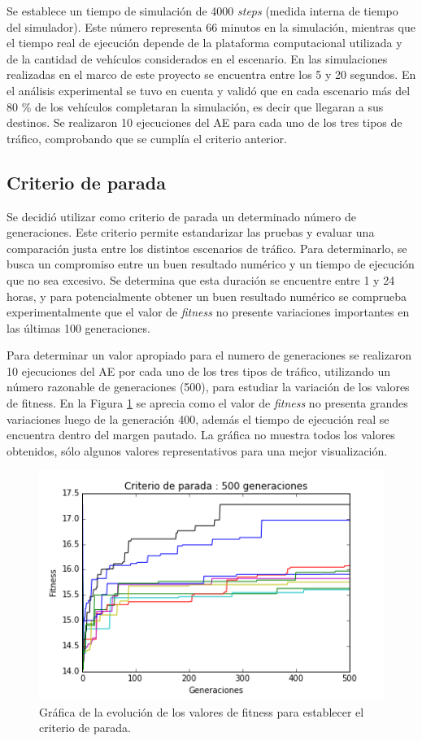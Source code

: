 Se establece un tiempo de simulación de 4000 \emph{steps} (medida interna de tiempo del simulador). Este número representa 66 minutos en la simulación, mientras que el tiempo real de ejecución depende de la plataforma computacional utilizada y de la cantidad de vehículos considerados en el escenario. En las simulaciones realizadas en el marco de este proyecto se encuentra entre los 5 y 20 segundos. En el análisis experimental se tuvo en cuenta y validó que en cada escenario más del 80 \% de los vehículos completaran la simulación, es decir que llegaran a sus destinos. Se realizaron 10 ejecuciones del AE para cada uno de los tres tipos de tráfico, comprobando que se cumplía el criterio anterior.


\subsection{Criterio de parada}
Se decidió utilizar como criterio de parada un determinado número de generaciones. Este criterio permite estandarizar las pruebas y evaluar una comparación justa entre los distintos escenarios de tráfico. Para determinarlo, se busca un compromiso entre un buen resultado numérico y un tiempo de ejecución que no sea excesivo. Se determina que esta duración se encuentre entre 1 y 24 horas, y para potencialmente obtener un buen resultado numérico se comprueba experimentalmente que el valor de \emph{fitness} no presente variaciones importantes en las últimas 100 generaciones.  

Para determinar un valor apropiado para el numero de generaciones se realizaron 10 ejecuciones del AE por cada uno de los tres tipos de tráfico, utilizando un número razonable de generaciones (500), para estudiar la variación de los valores de fitness. En la Figura \ref{fig:criterio_parada} se aprecia como el valor de \emph{fitness} no presenta grandes variaciones luego de la generación 400, además el tiempo de ejecución real se encuentra dentro del margen pautado. La gráfica no muestra todos los valores obtenidos, sólo algunos valores representativos para una mejor visualización.

\begin{figure}[h]
\centering
\includegraphics[width=0.8\linewidth]{Figures/criterio_parada}
\caption[Gráfica de la evolución de los valores de fitness. ]{Gráfica de la evolución de los valores de fitness para establecer el criterio de parada.}
\label{fig:criterio_parada}
\end{figure}

